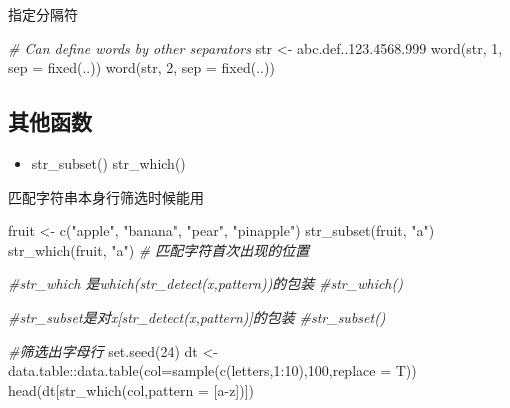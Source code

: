 \documentclass[
]{book}
\newenvironment{Shaded}{\begin{snugshade}}{\end{snugshade}}
\newcommand{\AttributeTok}[1]{\textcolor[rgb]{0.77,0.63,0.00}{#1}}
\newcommand{\CommentTok}[1]{\textcolor[rgb]{0.56,0.35,0.01}{\textit{#1}}}
\newcommand{\DecValTok}[1]{\textcolor[rgb]{0.00,0.00,0.81}{#1}}
\newcommand{\FunctionTok}[1]{\textcolor[rgb]{0.00,0.00,0.00}{#1}}
\newcommand{\NormalTok}[1]{#1}
\newcommand{\OtherTok}[1]{\textcolor[rgb]{0.56,0.35,0.01}{#1}}
\newcommand{\SpecialCharTok}[1]{\textcolor[rgb]{0.00,0.00,0.00}{#1}}
\newcommand{\StringTok}[1]{\textcolor[rgb]{0.31,0.60,0.02}{#1}}
\providecommand{\tightlist}{%
  \setlength{\itemsep}{0pt}\setlength{\parskip}{0pt}}
\begin{document}
指定分隔符

\begin{Shaded}
\begin{Highlighting}[]
\CommentTok{\# Can define words by other separators}
\NormalTok{str }\OtherTok{\textless{}{-}} \StringTok{\textquotesingle{}abc.def..123.4568.999\textquotesingle{}}
\FunctionTok{word}\NormalTok{(str, }\DecValTok{1}\NormalTok{, }\AttributeTok{sep =} \FunctionTok{fixed}\NormalTok{(}\StringTok{\textquotesingle{}..\textquotesingle{}}\NormalTok{))}
\FunctionTok{word}\NormalTok{(str, }\DecValTok{2}\NormalTok{, }\AttributeTok{sep =} \FunctionTok{fixed}\NormalTok{(}\StringTok{\textquotesingle{}..\textquotesingle{}}\NormalTok{))}
\end{Highlighting}
\end{Shaded}

\hypertarget{ux5176ux4ed6ux51fdux6570}{%
\subsection{其他函数}\label{ux5176ux4ed6ux51fdux6570}}

\begin{itemize}
\tightlist
\item
  str\_subset() str\_which()
\end{itemize}

匹配字符串本身行筛选时候能用

\begin{Shaded}
\begin{Highlighting}[]

\NormalTok{fruit }\OtherTok{\textless{}{-}} \FunctionTok{c}\NormalTok{(}\StringTok{"apple"}\NormalTok{, }\StringTok{"banana"}\NormalTok{, }\StringTok{"pear"}\NormalTok{, }\StringTok{"pinapple"}\NormalTok{)}
\FunctionTok{str\_subset}\NormalTok{(fruit, }\StringTok{"a"}\NormalTok{)}
\FunctionTok{str\_which}\NormalTok{(fruit, }\StringTok{"a"}\NormalTok{) }\CommentTok{\# 匹配字符首次出现的位置}
\end{Highlighting}
\end{Shaded}

\begin{Shaded}
\begin{Highlighting}[]
\CommentTok{\#str\_which 是which(str\_detect(x,pattern))的包装}
\CommentTok{\#str\_which()}

\CommentTok{\#str\_subset是对x[str\_detect(x,pattern)]的包装}
\CommentTok{\#str\_subset()}

\CommentTok{\#筛选出字母行}
\FunctionTok{set.seed}\NormalTok{(}\DecValTok{24}\NormalTok{)}
\NormalTok{dt }\OtherTok{\textless{}{-}}\NormalTok{ data.table}\SpecialCharTok{::}\FunctionTok{data.table}\NormalTok{(}\AttributeTok{col=}\FunctionTok{sample}\NormalTok{(}\FunctionTok{c}\NormalTok{(letters,}\DecValTok{1}\SpecialCharTok{:}\DecValTok{10}\NormalTok{),}\DecValTok{100}\NormalTok{,}\AttributeTok{replace =}\NormalTok{ T))}
\FunctionTok{head}\NormalTok{(dt[}\FunctionTok{str\_which}\NormalTok{(col,}\AttributeTok{pattern =} \StringTok{\textquotesingle{}[a{-}z]\textquotesingle{}}\NormalTok{)])}
\end{Highlighting}
\end{Shaded}
\end{document}
